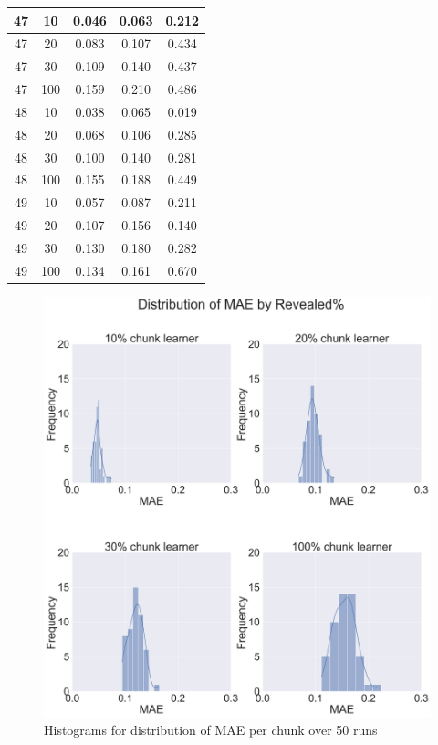 \begin{longtable}{ |c|c|c|c|c| }
            47 & 10 & 0.046 & 0.063 & 0.212 \\ \hline
            47 & 20 & 0.083 & 0.107 & 0.434 \\ \hline
            47 & 30 & 0.109 & 0.140 & 0.437 \\ \hline
            47 & 100 & 0.159 & 0.210 & 0.486 \\ \hline
            48 & 10 & 0.038 & 0.065 & 0.019 \\ \hline
            48 & 20 & 0.068 & 0.106 & 0.285 \\ \hline
            48 & 30 & 0.100 & 0.140 & 0.281 \\ \hline
            48 & 100 & 0.155 & 0.188 & 0.449 \\ \hline
            49 & 10 & 0.057 & 0.087 & 0.211 \\ \hline
            49 & 20 & 0.107 & 0.156 & 0.140 \\ \hline
            49 & 30 & 0.130 & 0.180 & 0.282 \\ \hline
            49 & 100 & 0.134 & 0.161 & 0.670 \\ \hline
    \end{longtable}


    \begin{figure}[!htb]
        \captionsetup{justification=raggedright}
        \centering
        \includegraphics[width=\textwidth]{./Chapters/06 Results/hist_mae.jpg}
        \centering
        \caption{Histograms for distribution of MAE per chunk over 50 runs}
    \end{figure}


